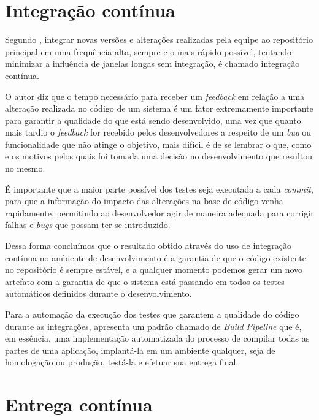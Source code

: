 \documentclass[
	12pt,				%
	openright,			%
	oneside,			%
	a4paper,			%
	english,			%
	french,				%
	spanish,			%
	brazil,				%
	]{abntex2}
\begin{document}
\section{Integração contínua}

Segundo , integrar novas versões e alterações realizadas pela equipe ao repositório principal em uma frequência alta, sempre e o mais rápido possível, tentando minimizar a influência de janelas longas sem integração, é chamado integração contínua. 

O autor diz que o tempo necessário para receber um \textit{feedback} em relação a uma alteração realizada no código de um sistema é um fator extremamente importante para garantir a qualidade do que está sendo desenvolvido, uma vez que quanto mais tardio o \textit{feedback} for recebido pelos desenvolvedores a respeito de um \textit{bug} ou funcionalidade que não atinge o objetivo, mais difícil é de se lembrar o que, como e os motivos pelos quais foi tomada uma decisão no desenvolvimento que resultou no mesmo.

\begin{citacao}
	É importante que a maior parte possível dos testes seja executada a cada \textit{commit}, para que a informação do impacto das alterações na base de código venha rapidamente, permitindo ao desenvolvedor agir de maneira adequada para corrigir falhas e \textit{bugs} que possam ter se introduzido.
	\cite{Caelum:ArquiteturaJava}
\end{citacao}

Dessa forma concluímos que o resultado obtido através do uso de integração contínua no ambiente de desenvolvimento é a garantia de que o código existente no repositório é sempre estável, e a qualquer momento podemos gerar um novo artefato com a garantia de que o sistema está passando em todos os testes automáticos definidos durante o desenvolvimento.

Para a automação da execução dos testes que garantem a qualidade do código durante as integrações,  apresenta um padrão chamado de \textit{Build Pipeline} que é, em essência, uma implementação automatizada do processo de compilar todas as partes de uma aplicação, implantá-la em um ambiente qualquer, seja de homologação ou produção, testá-la e efetuar sua entrega final.

\section{Entrega contínua}
\end{document}
